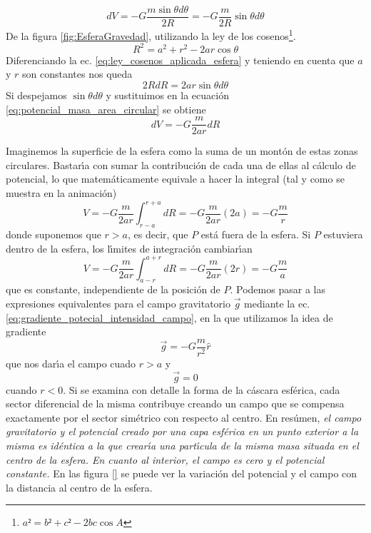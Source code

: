 \begin{equation}
dV=-G\frac{m \sin \theta d \theta}{2R}=-G\frac{m}{2R}\sin \theta d\theta
\label{eq:potencial_masa_area_circular}
\end{equation}
De la figura \ref{fig:EsferaGravedad}, utilizando la ley de los cosenos\footnote{$a²=b²+c²-2bc \cos A$}.
\begin{equation}
R^2= a^2+r^2-2ar \cos \theta
\label{eq:ley_cosenos_aplicada_esfera}
\end{equation}
Diferenciando la ec. \ref{eq:ley_cosenos_aplicada_esfera} y teniendo en cuenta que $a$ y $r$ son constantes nos queda
\begin{equation}
2RdR=2 a r \sin \theta d \theta
\label{eq:der_ley_cosenos_aplicada_esfera}
\end{equation}
Si despejamos $\sin \theta d \theta$ y sustituimos en la ecuaci\'on \ref{eq:potencial_masa_area_circular} se obtiene
\begin{equation}
dV=-G\frac{m}{2ar}dR
\label{eq:potencial_masa_area_circular_2}
\end{equation}

Imaginemos la superficie de la esfera como la suma de un mont\'on de estas zonas circulares. Bastar\'\i{}a con sumar la contribuci\'on de cada una de ellas al c\'alculo de potencial, lo que matem\'aticamente equivale a hacer la integral (tal y como se muestra en la animaci\'on\cite{Newton2006})
\begin{equation}
V=-G\frac{m}{2ar}\int _{r-a}^{r+a}dR=-G\frac{m}{2ar}(2a)=-G\frac{m}{r}
\label{eq:potencial_masa_area_circular_3}
\end{equation}
donde suponemos que $r>a$, es decir, que $P$ est\'a fuera de la esfera.  Si $P$ estuviera dentro de la esfera, los l\'\i{}mites de integraci\'on cambiar\'\i{}an
\begin{equation}
V=-G\frac{m}{2ar}\int _{a-r}^{a+r}dR=-G\frac{m}{2ar}(2r)=-G\frac{m}{a}
\label{eq:potencial_masa_area_circular_4}
\end{equation}
que es constante, independiente de la posici\'on de $P$. Podemos pasar a las expresiones equivalentes para el campo gravitatorio $\vec{g}$ mediante la ec. \ref{eq:gradiente_potecial_intensidad_campo}, en la que utilizamos la idea de gradiente
\begin{equation}
\vec{g}=-G\frac{m}{r^2}\hat{r}
\label{eq:campo_masa_area_circular_1}
\end{equation}
que nos dar\'\i{}a el campo cuado $r>a$ y
\begin{equation}
\vec{g}=0
\label{eq:campo_masa_area_circular_2}
\end{equation}
cuando $r<0$. Si se examina con detalle la forma de la c\'ascara esf\'erica, cada sector diferencial de la misma contribuye creando un campo que se compensa exactamente por el sector sim\'etrico con respecto al centro.  En res\'umen, \emph{el campo gravitatorio y el potencial creado por una capa esf\'erica en un punto exterior a la misma es id\'entica a la que crear\'\i{}a una part\'\i{}cula de la misma masa situada en el centro de la esfera. En cuanto al interior, el campo es cero y el potencial constante.} En las figura \ref{} se puede ver la variaci\'on del potencial y el campo con la distancia al centro de la esfera.

